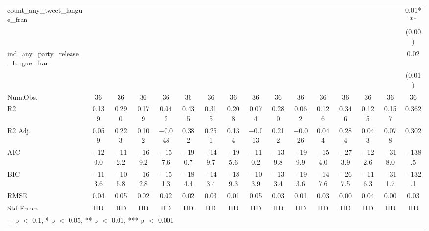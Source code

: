 \begin{table}
\begin{tabular}[t]{lccccccccccccccc}
count\_any\_tweet\_langue\_fran &  &  &  &  &  &  &  &  &  &  &  &  &  &  & \num{0.01}***\\
 &  &  &  &  &  &  &  &  &  &  &  &  &  &  & (\num{0.00})\\
ind\_any\_party\_release\_langue\_fran &  &  &  &  &  &  &  &  &  &  &  &  &  &  & \num{0.02}\\
 &  &  &  &  &  &  &  &  &  &  &  &  &  &  & (\num{0.01})\\
\midrule
Num.Obs. & \num{36} & \num{36} & \num{36} & \num{36} & \num{36} & \num{36} & \num{36} & \num{36} & \num{36} & \num{36} & \num{36} & \num{36} & \num{36} & \num{36} & \num{36}\\
R2 & \num{0.139} & \num{0.290} & \num{0.179} & \num{0.042} & \num{0.435} & \num{0.315} & \num{0.208} & \num{0.074} & \num{0.280} & \num{0.062} & \num{0.126} & \num{0.346} & \num{0.125} & \num{0.157} & \num{0.362}\\
R2 Adj. & \num{0.059} & \num{0.223} & \num{0.102} & \num{-0.048} & \num{0.382} & \num{0.251} & \num{0.134} & \num{-0.013} & \num{0.212} & \num{-0.026} & \num{0.044} & \num{0.284} & \num{0.043} & \num{0.078} & \num{0.302}\\
AIC & \num{-120.0} & \num{-112.2} & \num{-169.2} & \num{-157.6} & \num{-190.7} & \num{-149.7} & \num{-195.6} & \num{-110.2} & \num{-139.8} & \num{-199.9} & \num{-154.0} & \num{-273.9} & \num{-122.6} & \num{-318.0} & \num{-138.5}\\
BIC & \num{-113.6} & \num{-105.8} & \num{-162.8} & \num{-151.3} & \num{-184.4} & \num{-143.4} & \num{-189.3} & \num{-103.9} & \num{-133.4} & \num{-193.6} & \num{-147.6} & \num{-267.5} & \num{-116.3} & \num{-311.7} & \num{-132.1}\\
RMSE & \num{0.04} & \num{0.05} & \num{0.02} & \num{0.02} & \num{0.02} & \num{0.03} & \num{0.01} & \num{0.05} & \num{0.03} & \num{0.01} & \num{0.03} & \num{0.00} & \num{0.04} & \num{0.00} & \num{0.03}\\
Std.Errors & IID & IID & IID & IID & IID & IID & IID & IID & IID & IID & IID & IID & IID & IID & IID\\
\bottomrule
\multicolumn{16}{l}{\rule{0pt}{1em}+ p $<$ 0.1, * p $<$ 0.05, ** p $<$ 0.01, *** p $<$ 0.001}\\
\end{tabular}
\end{table}

